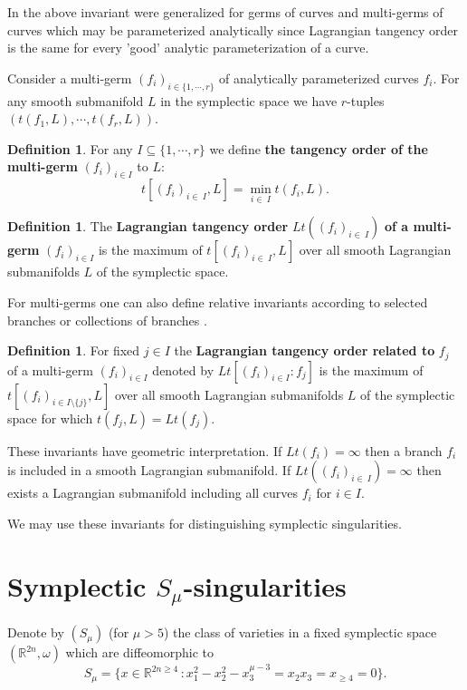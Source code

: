 \documentclass{amsart}
\theoremstyle{definition}
\newtheorem{defn}[thm]{Definition}
\numberwithin{equation}{section}
\begin{document}
In \cite{DT}  the above invariant were generalized for germs of
curves and multi-germs of curves which may be parameterized
analytically since Lagrangian tangency order is the same for every
'good' analytic parameterization of a curve.

Consider a multi-germ $(f_i)_{i\in\{1,\cdots,r\}}$ of analytically
parameterized curves $f_i$. For any smooth submanifold $L$ in the
symplectic space we have $r$-tuples $(t(f_1,L), \cdots,
t(f_r,L))$.

\begin{defn}
For any $I\subseteq \{1,\cdots, r\}$ we define \textbf{the tangency order of the multi-germ } $(f_i)_{i\in I}$ to $L$:
$$t[(f_i)_{i\in\ I},L]=\min_{i\in\ I} t(f_i,L).$$
\end{defn}

\begin{defn}
The {\bf Lagrangian tangency order} $Lt((f_i)_{i\in\ I})$ \textbf{of a multi-germ } $(f_i)_{i\in I}$ is the maximum of $t[(f_i)_{i\in\ I},L]$ over all smooth Lagrangian submanifolds $L$ of the symplectic space.
\end{defn}

 For multi-germs one can also define relative invariants according to selected branches or collections of branches \cite{DT}.

\begin{defn}
For fixed $j\in I$  the \textbf{ Lagrangian tangency order related to}  $f_j$ of a multi-germ  $(f_i)_{i\in I}$ \textbf{} denoted by $Lt[(f_i)_{i\in I}: f_j]$ is the maximum of $t[(f_i)_{i\in I\setminus\{j\}},L]$ over all smooth Lagrangian submanifolds $L$ of the symplectic space for which $t(f_j,L)=Lt(f_j)$.
\end{defn}

These invariants have geometric interpretation.
If $Lt(f_i)=\infty$ then a branch $f_i$ is included in a smooth Lagrangian submanifold.
If $Lt((f_i)_{i\in\ I})=\infty$ then exists a Lagrangian submanifold including all curves $f_i$ for $i\in I$.

We may use these invariants for distinguishing symplectic singularities.

\newpage

\section{Symplectic $S_{\mu}$-singularities}\label{S}

Denote by $(S_{\mu})$  (for $\mu>5$) the class of varieties in  a fixed symplectic
space $(\mathbb R^{2n}, \omega )$ which are diffeomorphic to
\begin{equation}
\label{defs} S_{\mu}=\{x\in \mathbb R ^{2n\geq 4}\,:x_1^2-x_2^2-x_3^{\mu -3}=x_2 x_3=x_{\geq 4}=0\}.\end{equation}
\end{document}
